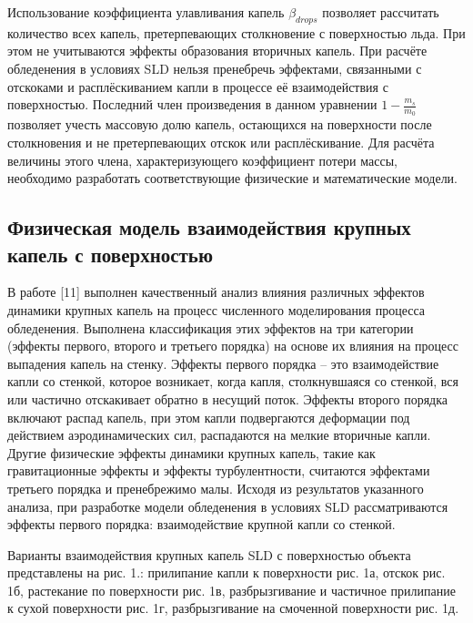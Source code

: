 \documentclass{psta}%
\begin{document}
Использование коэффициента улавливания капель $\beta_{drops}$ позволяет рассчитать количество всех капель, претерпевающих столкновение с поверхностью льда.
При этом не учитываются эффекты образования вторичных капель.
При расчёте обледенения в условиях SLD нельзя пренебречь эффектами, связанными с отскоками и расплёскиванием капли в процессе её взаимодействия с поверхностью.
Последний член произведения в данном уравнении $1 - \frac{m_s}{m_0}$ позволяет учесть массовую долю капель, остающихся на поверхности после столкновения и не претерпевающих отскок или расплёскивание.
Для расчёта величины этого члена, характеризующего коэффициент потери массы, необходимо разработать соответствующие физические и математические модели.

\subsection{Физическая модель взаимодействия крупных капель с поверхностью}

В работе [11] выполнен качественный анализ влияния различных эффектов динамики крупных капель на процесс численного моделирования процесса обледенения.
Выполнена классификация этих эффектов на три категории (эффекты первого, второго и третьего порядка) на основе их влияния на процесс выпадения капель на стенку.
Эффекты первого порядка -- это взаимодействие капли со стенкой, которое возникает, когда капля, столкнувшаяся со стенкой, вся или частично отскакивает обратно в несущий поток.
Эффекты второго порядка включают распад капель, при этом капли подвергаются деформации под действием аэродинамических сил, распадаются на мелкие вторичные капли.
Другие физические эффекты динамики крупных капель, такие как гравитационные эффекты и эффекты турбулентности, считаются эффектами третьего порядка и пренебрежимо малы.
Исходя из результатов указанного анализа, при разработке модели обледенения в условиях SLD рассматриваются эффекты первого порядка: взаимодействие крупной капли со стенкой.

Варианты взаимодействия крупных капель SLD с поверхностью объекта представлены на рис. 1.: прилипание капли к поверхности рис. 1а, отскок рис. 1б, растекание по поверхности рис. 1в, разбрызгивание и частичное прилипание к сухой поверхности рис. 1г, разбрызгивание на смоченной поверхности рис. 1д.
\end{document}
